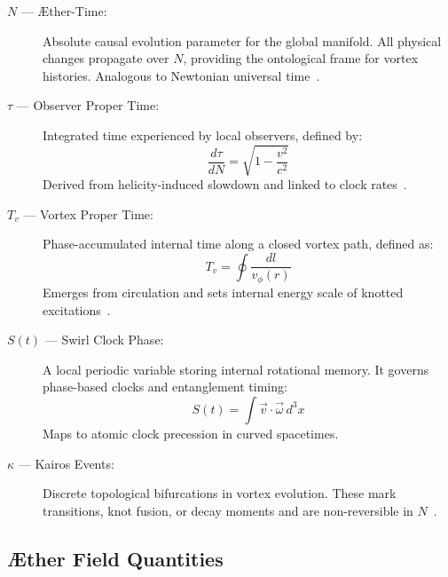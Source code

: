 \documentclass[12pt]{article}
\begin{document}
            \begin{description}
                \item[$N$ — Æther-Time:] Absolute causal evolution parameter for the global manifold. All physical changes propagate over $N$, providing the ontological frame for vortex histories. Analogous to Newtonian universal time~\cite{volovik2003universe, ranada1990topological}.
        
                \item[$\tau$ — Observer Proper Time:] Integrated time experienced by local observers, defined by:
                \[
                \frac{d\tau}{dN} = \sqrt{1 - \frac{v^2}{c^2}}
                \]
                Derived from helicity-induced slowdown and linked to clock rates~\cite{moffatt1969knottedness}.
        
                \item[$T_v$ — Vortex Proper Time:] Phase-accumulated internal time along a closed vortex path, defined as:
                \[
                T_v = \oint \frac{dl}{v_\phi(r)}
                \]
                Emerges from circulation and sets internal energy scale of knotted excitations~\cite{volovik2003universe}.
        
                \item[$S(t)$ — Swirl Clock Phase:] A local periodic variable storing internal rotational memory. It governs phase-based clocks and entanglement timing:
                \[
                S(t) = \int \vec{v} \cdot \vec{\omega} \, d^3x
                \]
                Maps to atomic clock precession in curved spacetimes.
        
                \item[$\kappa$ — Kairos Events:] Discrete topological bifurcations in vortex evolution. These mark transitions, knot fusion, or decay moments and are non-reversible in $N$~\cite{kleckner2013knots, moffatt1969knottedness}.
            \end{description}
        
            \subsection{Æther Field Quantities}
        
\end{document}
